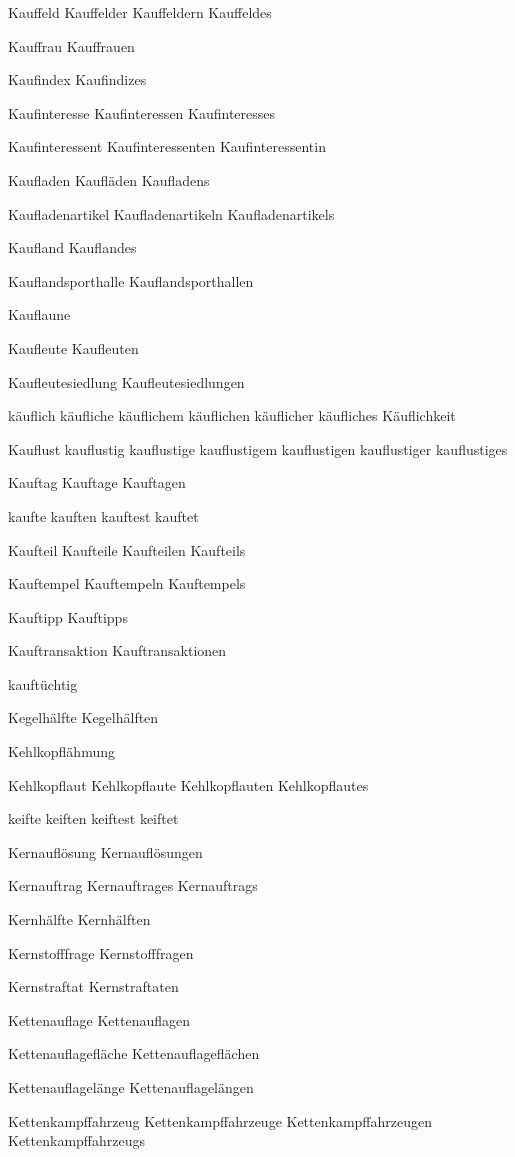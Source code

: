 Kauffeld
Kauffelder
Kauffeldern
Kauffeldes

Kauffrau
Kauffrauen

Kaufindex 
Kaufindizes

Kaufinteresse
Kaufinteressen
Kaufinteresses

Kaufinteressent
Kaufinteressenten
Kaufinteressentin

Kaufladen
Kaufläden
Kaufladens

Kaufladenartikel
Kaufladenartikeln
Kaufladenartikels

Kaufland
Kauflandes

Kauflandsporthalle
Kauflandsporthallen

Kauflaune

Kaufleute
Kaufleuten

Kaufleutesiedlung
Kaufleutesiedlungen

käuflich
käufliche
käuflichem
käuflichen
käuflicher
käufliches
Käuflichkeit

Kauflust
kauflustig
kauflustige
kauflustigem
kauflustigen
kauflustiger
kauflustiges

Kauftag
Kauftage
Kauftagen

kaufte
kauften
kauftest
kauftet

Kaufteil
Kaufteile
Kaufteilen
Kaufteils

Kauftempel
Kauftempeln
Kauftempels

Kauftipp
Kauftipps

Kauftransaktion
Kauftransaktionen

kauftüchtig

Kegelhälfte
Kegelhälften

Kehlkopflähmung

Kehlkopflaut
Kehlkopflaute
Kehlkopflauten
Kehlkopflautes

keifte
keiften
keiftest
keiftet

Kernauflösung
Kernauflösungen

Kernauftrag
Kernauftrages
Kernauftrags

Kernhälfte
Kernhälften

Kernstofffrage
Kernstofffragen

Kernstraftat
Kernstraftaten

Kettenauflage 
Kettenauflagen

Kettenauflagefläche
Kettenauflageflächen

Kettenauflagelänge
Kettenauflagelängen

Kettenkampffahrzeug
Kettenkampffahrzeuge
Kettenkampffahrzeugen
Kettenkampffahrzeugs

